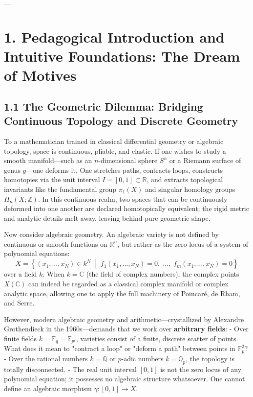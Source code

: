 \documentclass[11pt,twoside,openright]{amsbook}
\begin{document}
{---

\section{1. Pedagogical Introduction and Intuitive Foundations: The Dream of Motives}

\subsection{1.1 The Geometric Dilemma: Bridging Continuous Topology and Discrete Geometry}
To a mathematician trained in classical differential geometry or algebraic topology, space is continuous, pliable, and elastic. If one wishes to study a smooth manifold—such as an $n$-dimensional sphere $S^n$ or a Riemann surface of genus $g$—one deforms it. One stretches paths, contracts loops, constructs homotopies via the unit interval $I = [0, 1] \subset \mathbb{R}$, and extracts topological invariants like the fundamental group $\pi_1(X)$ and singular homology groups $H_n(X; \mathbb{Z})$. In this continuous realm, two spaces that can be continuously deformed into one another are declared homotopically equivalent; the rigid metric and analytic details melt away, leaving behind pure geometric shape.

Now consider algebraic geometry. An algebraic variety is not defined by continuous or smooth functions on $\mathbb{R}^n$, but rather as the zero locus of a system of polynomial equations:
$$X = \left\{ (x_1, \dots, x_N) \in k^N \;\middle\vert\; f_1(x_1, \dots, x_N) = 0, \; \dots, \; f_m(x_1, \dots, x_N) = 0 \right\}$$
over a field $k$. When $k = \mathbb{C}$ (the field of complex numbers), the complex points $X(\mathbb{C})$ can indeed be regarded as a classical complex manifold or complex analytic space, allowing one to apply the full machinery of Poincaré, de Rham, and Serre.

However, modern algebraic geometry and arithmetic—crystallized by Alexandre Grothendieck in the 1960s—demands that we work over \textbf{arbitrary fields}:
- Over finite fields $k = \mathbb{F}_q = \mathbb{F}_{p^r}$, varieties consist of a finite, discrete scatter of points. What does it mean to "contract a loop" or "deform a path" between points in $\mathbb{F}_p^2$?
- Over the rational numbers $k = \mathbb{Q}$ or $p$-adic numbers $k = \mathbb{Q}_p$, the topology is totally disconnected. 
- The real unit interval $[0, 1]$ is not the zero locus of any polynomial equation; it possesses no algebraic structure whatsoever. One cannot define an algebraic morphism $\gamma: [0, 1] \to X$.

}
\end{document}
